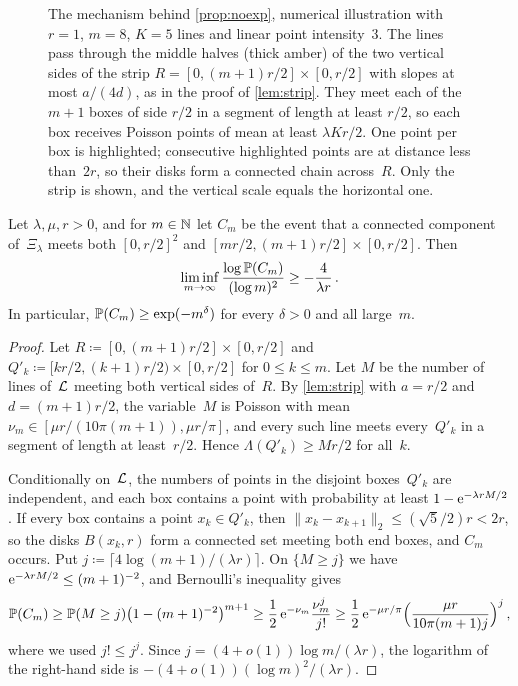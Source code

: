\documentclass[11pt,letterpaper]{article}
\begin{document}
\begin{figure}[ht]
  \centering
  
  \caption{The mechanism behind \cref{prop:noexp}, numerical illustration with $r=1$, $m=8$, $K=5$ lines and linear point intensity~$3$. The lines pass through the middle halves (thick amber) of the two vertical sides of the strip $R=[0,(m+1)r/2]\times[0,r/2]$ with slopes at most $a/(4d)$, as in the proof of \cref{lem:strip}. They meet each of the $m+1$ boxes of side $r/2$ in a segment of length at least $r/2$, so each box receives Poisson points of mean at least $\lambda Kr/2$. One point per box is highlighted; consecutive highlighted points are at distance less than~$2r$, so their disks form a connected chain across~$R$. Only the strip is shown, and the vertical scale equals the horizontal one.}
  \label{fig:bundle}
\end{figure}

\begin{proposition}
\label{prop:noexp}
Let $\lambda,\mu,r>0$, and for $m\in\N$ let $C_m$ be the event that a connected component of~$\Xi_\lambda$ meets both $[0,r/2]^2$ and $[mr/2,(m+1)r/2]\times[0,r/2]$. Then
\begin{equation*}
  \liminf_{m\to\infty}\frac{\log\P(C_m)}{(\log m)^2}\ge-\frac{4}{\lambda r}\,.
\end{equation*}
In particular, $\P(C_m)\ge\exp(-m^\delta)$ for every $\delta>0$ and all large~$m$.
\end{proposition}

\begin{proof}
Let $R\coloneqq[0,(m+1)r/2]\times[0,r/2]$ and $Q'_k\coloneqq[kr/2,(k+1)r/2)\times[0,r/2]$ for $0\le k\le m$. Let $M$ be the number of lines of~$\cL$ meeting both vertical sides of~$R$. By \cref{lem:strip} with $a=r/2$ and $d=(m+1)r/2$, the variable~$M$ is Poisson with mean $\nu_m\in[\mu r/(10\pi(m+1)),\mu r/\pi]$, and every such line meets every~$Q'_k$ in a segment of length at least~$r/2$. Hence $\Lambda(Q'_k)\ge Mr/2$ for all~$k$.

Conditionally on~$\cL$, the numbers of points in the disjoint boxes~$Q'_k$ are independent, and each box contains a point with probability at least $1-\e^{-\lambda rM/2}$. If every box contains a point $x_k\in Q'_k$, then $\lVert x_k-x_{k+1}\rVert_2\le(\sqrt5/2)r<2r$, so the disks $B(x_k,r)$ form a connected set meeting both end boxes, and $C_m$ occurs. Put $j\coloneqq\lceil4\log(m+1)/(\lambda r)\rceil$. On $\{M\ge j\}$ we have $\e^{-\lambda rM/2}\le(m+1)^{-2}$, and Bernoulli's inequality gives
\begin{equation*}
  \P(C_m)\ge\P(M\ge j)\bigl(1-(m+1)^{-2}\bigr)^{m+1}\ge\frac12\,\e^{-\nu_m}\frac{\nu_m^j}{j!}\ge\frac12\,\e^{-\mu r/\pi}\Bigl(\frac{\mu r}{10\pi(m+1)j}\Bigr)^j\,,
\end{equation*}
where we used $j!\le j^j$. Since $j=(4+o(1))\log m/(\lambda r)$, the logarithm of the right-hand side is $-(4+o(1))(\log m)^2/(\lambda r)$.
\end{proof}
\end{document}
